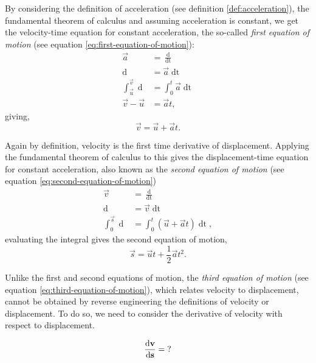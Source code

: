 By considering the definition of acceleration (see definition \ref{def:acceleration}), the fundamental theorem of calculus and assuming acceleration is constant, we get the velocity-time equation for constant acceleration, the so-called \textit{first equation of motion} (see equation \ref{eq:first-equation-of-motion}):
\begin{align*}
    \vec{a} &= \frac{\mathop{\mathrm{d}\vec{v}}}{\mathop{\mathrm{d}t}} \\
    \mathop{\mathrm{d}\vec{v}} &= \vec{a}\mathop{\mathrm{d}t} \\
    \int_{\vec{u}}^{\vec{v}} \mathop{\mathrm{d}\vec{v}} &= \int_0^t \vec{a}\mathop{\mathrm{d}t} \\
    \vec{v} - \vec{u} &= \vec{a}t,
\end{align*}
giving, 
\begin{equation}
    \label{eq:first-equation-of-motion}
    \vec{v} = \vec{u} + \vec{a}t.
\end{equation}

Again by definition, velocity is the first time derivative of displacement. Applying the fundamental theorem of calculus to this gives the displacement-time equation for constant acceleration, also known as the \textit{second equation of motion} (see equation \ref{eq:second-equation-of-motion})
\begin{align*}
    \vec{v} &= \frac{\mathop{\mathrm{d}\vec{s}}}{\mathop{\mathrm{d}t}} \\
    \mathop{\mathrm{d}\vec{s}} &= \vec{v}\mathop{\mathrm{d}t} \\
    \int_0^{\vec{s}} \mathop{\mathrm{d}\vec{s}} &= \int_0^t (\vec{u} + \vec{a}t) \mathop{\mathrm{d}t},
\end{align*}
evaluating the integral gives the second equation of motion,
\begin{equation}
    \label{eq:second-equation-of-motion}
    \vec{s}= \vec{u}t + \frac{1}{2}\vec{a}t^2.
\end{equation}

Unlike the first and second equations of motion, the \textit{third equation of motion} (see equation \ref{eq:third-equation-of-motion}), which relates velocity to displacement, cannot be obtained by reverse engineering the definitions of velocity or displacement. To do so, we need to consider the derivative of velocity with respect to displacement. 

\begin{equation*}
    \frac{\mathop{\mathrm{d}\vec{v}}}{\mathop{\mathrm{d}\vec{s}}} = \hspace{1mm} ?
\end{equation*}

